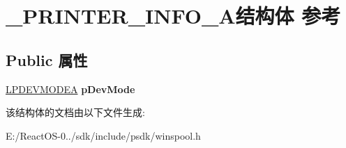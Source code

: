 \hypertarget{struct___p_r_i_n_t_e_r___i_n_f_o__9_a}{}\section{\+\_\+\+P\+R\+I\+N\+T\+E\+R\+\_\+\+I\+N\+F\+O\+\_\+A结构体 参考}
\label{struct___p_r_i_n_t_e_r___i_n_f_o__9_a}
\subsection*{Public 属性}
\begin{DoxyCompactItemize}
\item 
\mbox{\label{struct___p_r_i_n_t_e_r___i_n_f_o__9_a_a2d1637654111a246b02856744baa7819}} 
\hyperlink{struct__devicemode_a}{L\+P\+D\+E\+V\+M\+O\+D\+EA} {\bfseries p\+Dev\+Mode}
\end{DoxyCompactItemize}


该结构体的文档由以下文件生成\+:\begin{DoxyCompactItemize}
\item 
E\+:/\+React\+O\+S-\/0../sdk/include/psdk/winspool.\+h\end{DoxyCompactItemize}
